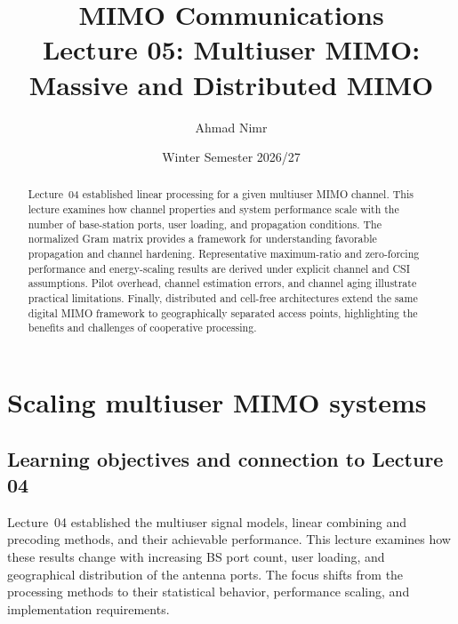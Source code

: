 

\providecommand{\RH}{R_{\ma H}}
\title{MIMO Communications\\Lecture 05: Multiuser MIMO:\\Massive and Distributed MIMO}
\author{Ahmad Nimr}
\date{Winter Semester 2026/27}


\acresetall
\maketitle

\begin{abstract}
	Lecture~04 established linear processing for a given multiuser MIMO channel. This lecture examines how channel properties and system performance scale with the number of base-station ports, user loading, and propagation conditions. The normalized Gram matrix provides a framework for understanding favorable propagation and channel hardening. Representative maximum-ratio and zero-forcing performance and energy-scaling results are derived under explicit channel and CSI assumptions. Pilot overhead, channel estimation errors, and channel aging illustrate practical limitations. Finally, distributed and cell-free architectures extend the same digital MIMO framework to geographically separated access points, highlighting the benefits and challenges of cooperative processing.
\end{abstract}

\acresetall
\tableofcontents
\newpage



\section{Scaling multiuser MIMO systems}
\label{sec:scaling-05}

\subsection{Learning objectives and connection to Lecture 04}
Lecture~04 established the multiuser signal models, linear combining and precoding methods, and their achievable performance. This lecture examines how these results change with increasing BS port count, user loading, and geographical distribution of the antenna ports. The focus shifts from the processing methods to their statistical behavior, performance scaling, and implementation requirements.

